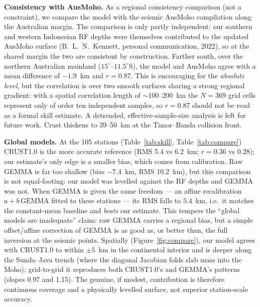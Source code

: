 \documentclass{agujournal2019}
\begin{document}
\textbf{Consistency with AusMoho.} As a regional consistency comparison (not a
constraint), we compare the model with the seismic AusMoho compilation
\cite{kennett2011} along the Australian margin. The comparison is only partly
independent: our southern and western Indonesian RF depths \cite{fauzi2021} were
themselves contributed to the updated AusMoho surface (B.~L.~N.~Kennett, personal
communication, 2022), so at the shared margin the two are consistent by
construction. Farther south, over the northern Australian mainland
($15^{\circ}$--$11.5^{\circ}$S), the model and AusMoho agree with a mean difference
of $-1.9$~km and $r=0.87$. This is encouraging for the \emph{absolute level}, but
the correlation is over two smooth surfaces sharing a strong regional gradient: with
a spatial correlation length of $\sim$100--200~km the $N=369$ grid cells represent
only of order ten independent samples, so $r=0.87$ should not be read as a
formal skill estimate. A detrended, effective-sample-size analysis is left for
future work. Crust thickens to 39--50~km at the Timor--Banda collision front.

\textbf{Global models.} At the 105 stations (Table~\ref{tab:skill},
Table~\ref{tab:compare}) CRUST1.0 is the more accurate reference (RMS 5.4 vs
6.2~km; $r=0.36$ vs 0.28); our estimate's only edge is a smaller bias, which comes
from calibration. Raw GEMMA is far too shallow (bias $-7.4$~km, RMS 10.2~km), but
this comparison is not equal-footing: our model was levelled against the RF depths
and GEMMA was not. When GEMMA is given the same freedom --- an affine recalibration
$a+b\,\mathrm{GEMMA}$ fitted to these stations --- its RMS falls to $5.4$~km, i.e.\
it matches the constant-mean baseline and \emph{beats} our estimate. This tempers
the ``global models are inadequate'' claim: raw GEMMA carries a regional bias, but
a simple offset/affine correction of GEMMA is as good as, or better than, the full
inversion at the seismic points. Spatially (Figure~\ref{fig:compare}), our model
agrees with CRUST1.0 to within $\pm5$~km in the continental interior and is deeper
along the Sunda--Java trench (where the diagonal Jacobian folds slab mass into the
Moho); grid-to-grid it reproduces both CRUST1.0's and GEMMA's patterns (slopes 0.97
and 1.15). The genuine, if modest, contribution is therefore continuous coverage and
a physically levelled surface, not superior station-scale accuracy.
\end{document}
